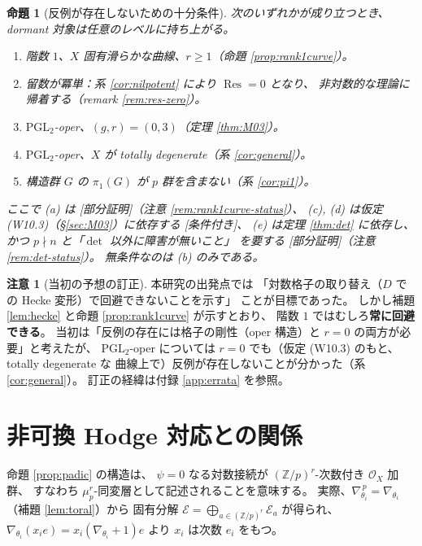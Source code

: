 \documentclass[a4paper,11pt]{ltjsarticle}
\theoremstyle{plain}
\newtheorem{proposition}[theorem]{命題}
\theoremstyle{definition}
\newtheorem{remark}[theorem]{注意}
\newcommand{\bbZ}{\mathbb{Z}}
\newcommand{\cE}{\mathcal{E}}
\newcommand{\cO}{\mathcal{O}}
\newcommand{\Res}{\operatorname{Res}}
\begin{document}
\begin{proposition}[反例が存在しないための十分条件]\label{prop:sufficient}
次のいずれかが成り立つとき、dormant 対象は任意のレベルに持ち上がる。
\begin{enumerate}[label=(\alph*),leftmargin=2em]
\item 階数 $1$、$X$ 固有滑らかな曲線、$r\ge1$（命題 \ref{prop:rank1curve}）。
\item 留数が冪単：系 \ref{cor:nilpotent} により $\Res=0$ となり、
      非対数的な理論に帰着する（remark \ref{rem:res-zero}）。
\item $\mathrm{PGL}_2$-oper、$(g,r)=(0,3)$（定理 \ref{thm:M03}）。
\item $\mathrm{PGL}_2$-oper、$X$ が totally degenerate（系 \ref{cor:general}）。
\item 構造群 $G$ の $\pi_1(G)$ が $p$ 群を含まない（系 \ref{cor:pi1}）。
\end{enumerate}
ここで (a) は \emph{[部分証明]}（注意 \ref{rem:rank1curve-status}）、
(c), (d) は仮定 (W10.3)（\S\ref{sec:M03}）に依存する \emph{[条件付き]}、
(e) は定理 \ref{thm:det} に依存し、かつ $p\nmid n$ と「$\det$ 以外に障害が無いこと」
を要する \emph{[部分証明]}（注意 \ref{rem:det-status}）。
無条件なのは (b) のみである。
\end{proposition}

\begin{remark}[当初の予想の訂正]
本研究の出発点では
「対数格子の取り替え（$D$ での Hecke 変形）で回避できないことを示す」
ことが目標であった。
しかし補題 \ref{lem:hecke} と命題 \ref{prop:rank1curve} が示すとおり、
階数 $1$ ではむしろ\textbf{常に回避できる}。
当初は「反例の存在には格子の剛性（oper 構造）と $r=0$ の両方が必要」と考えたが、
$\mathrm{PGL}_2$-oper については $r=0$ でも（仮定 (W10.3) のもと、totally degenerate な
曲線上で）反例が存在しないことが分かった（系 \ref{cor:general}）。
訂正の経緯は付録 \ref{app:errata} を参照。
\end{remark}

\section{非可換 Hodge 対応との関係}\label{sec:NAHT}

命題 \ref{prop:padic} の構造は、
$\psi=0$ なる対数接続が $(\bbZ/p)^r$-次数付き $\cO_X$ 加群、
すなわち $\mu_p^r$-同変層として記述されることを意味する。
実際、$\nabla_{\theta_i}^{\,p}=\nabla_{\theta_i}$（補題 \ref{lem:toral}）から
固有分解 $\cE=\bigoplus_{a\in(\bbZ/p)^r}\cE_a$ が得られ、
$\nabla_{\theta_i}(x_ie)=x_i(\nabla_{\theta_i}+1)e$ より
$x_i$ は次数 $e_i$ をもつ。
\end{document}
